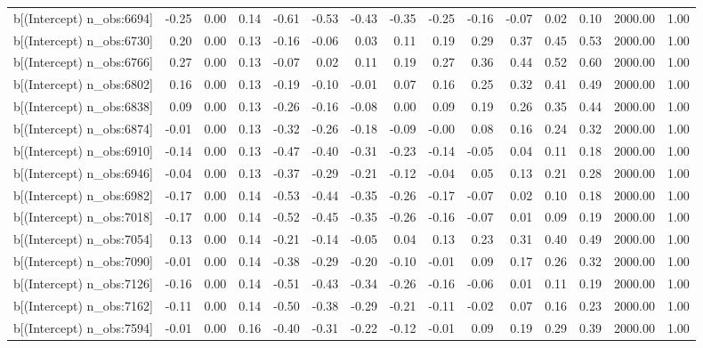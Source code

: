 \begin{table}[ht]
\begin{tabular}{rrrrrrrrrrrrrrr}
  b[(Intercept) n\_obs:6694] & -0.25 & 0.00 & 0.14 & -0.61 & -0.53 & -0.43 & -0.35 & -0.25 & -0.16 & -0.07 & 0.02 & 0.10 & 2000.00 & 1.00 \\ 
  b[(Intercept) n\_obs:6730] & 0.20 & 0.00 & 0.13 & -0.16 & -0.06 & 0.03 & 0.11 & 0.19 & 0.29 & 0.37 & 0.45 & 0.53 & 2000.00 & 1.00 \\ 
  b[(Intercept) n\_obs:6766] & 0.27 & 0.00 & 0.13 & -0.07 & 0.02 & 0.11 & 0.19 & 0.27 & 0.36 & 0.44 & 0.52 & 0.60 & 2000.00 & 1.00 \\ 
  b[(Intercept) n\_obs:6802] & 0.16 & 0.00 & 0.13 & -0.19 & -0.10 & -0.01 & 0.07 & 0.16 & 0.25 & 0.32 & 0.41 & 0.49 & 2000.00 & 1.00 \\ 
  b[(Intercept) n\_obs:6838] & 0.09 & 0.00 & 0.13 & -0.26 & -0.16 & -0.08 & 0.00 & 0.09 & 0.19 & 0.26 & 0.35 & 0.44 & 2000.00 & 1.00 \\ 
  b[(Intercept) n\_obs:6874] & -0.01 & 0.00 & 0.13 & -0.32 & -0.26 & -0.18 & -0.09 & -0.00 & 0.08 & 0.16 & 0.24 & 0.32 & 2000.00 & 1.00 \\ 
  b[(Intercept) n\_obs:6910] & -0.14 & 0.00 & 0.13 & -0.47 & -0.40 & -0.31 & -0.23 & -0.14 & -0.05 & 0.04 & 0.11 & 0.18 & 2000.00 & 1.00 \\ 
  b[(Intercept) n\_obs:6946] & -0.04 & 0.00 & 0.13 & -0.37 & -0.29 & -0.21 & -0.12 & -0.04 & 0.05 & 0.13 & 0.21 & 0.28 & 2000.00 & 1.00 \\ 
  b[(Intercept) n\_obs:6982] & -0.17 & 0.00 & 0.14 & -0.53 & -0.44 & -0.35 & -0.26 & -0.17 & -0.07 & 0.02 & 0.10 & 0.18 & 2000.00 & 1.00 \\ 
  b[(Intercept) n\_obs:7018] & -0.17 & 0.00 & 0.14 & -0.52 & -0.45 & -0.35 & -0.26 & -0.16 & -0.07 & 0.01 & 0.09 & 0.19 & 2000.00 & 1.00 \\ 
  b[(Intercept) n\_obs:7054] & 0.13 & 0.00 & 0.14 & -0.21 & -0.14 & -0.05 & 0.04 & 0.13 & 0.23 & 0.31 & 0.40 & 0.49 & 2000.00 & 1.00 \\ 
  b[(Intercept) n\_obs:7090] & -0.01 & 0.00 & 0.14 & -0.38 & -0.29 & -0.20 & -0.10 & -0.01 & 0.09 & 0.17 & 0.26 & 0.32 & 2000.00 & 1.00 \\ 
  b[(Intercept) n\_obs:7126] & -0.16 & 0.00 & 0.14 & -0.51 & -0.43 & -0.34 & -0.26 & -0.16 & -0.06 & 0.01 & 0.11 & 0.19 & 2000.00 & 1.00 \\ 
  b[(Intercept) n\_obs:7162] & -0.11 & 0.00 & 0.14 & -0.50 & -0.38 & -0.29 & -0.21 & -0.11 & -0.02 & 0.07 & 0.16 & 0.23 & 2000.00 & 1.00 \\ 
  b[(Intercept) n\_obs:7594] & -0.01 & 0.00 & 0.16 & -0.40 & -0.31 & -0.22 & -0.12 & -0.01 & 0.09 & 0.19 & 0.29 & 0.39 & 2000.00 & 1.00 \\ 

\end{tabular}
\end{table}
